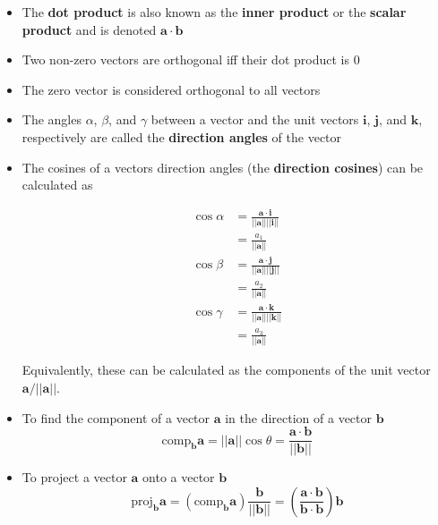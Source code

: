 \documentclass{article}
\begin{document}
\begin{itemize}
  \item The \textbf{dot product} is also known as the \textbf{inner product} or the \textbf{scalar product} and is denoted $\mathbf{a} \cdot \mathbf{b}$

  \item Two non-zero vectors are orthogonal iff their dot product is $0$

  \item The zero vector is considered orthogonal to all vectors

  \item The angles $\alpha$, $\beta$, and $\gamma$ between a vector and the unit vectors $\mathbf{i}$, $\mathbf{j}$, and $\mathbf{k}$, respectively are called the \textbf{direction angles} of the vector

  \item The cosines of a vectors direction angles (the \textbf{direction cosines}) can be calculated as

        \begin{align*}
          \cos \alpha & = \frac{\mathbf{a} \cdot \mathbf{i}}{||\mathbf{a}|| ||\mathbf{i}||} \\
                      & = \frac{a_1}{||\mathbf{a}||}                                        \\
          \cos \beta  & = \frac{\mathbf{a} \cdot \mathbf{j}}{||\mathbf{a}|| ||\mathbf{j}||} \\
                      & = \frac{a_2}{||\mathbf{a}||}                                        \\
          \cos \gamma & = \frac{\mathbf{a} \cdot \mathbf{k}}{||\mathbf{a}|| ||\mathbf{k}||} \\
                      & = \frac{a_3}{||\mathbf{a}||}
        \end{align*}

        Equivalently, these can be calculated as the components of the unit vector $\mathbf{a} / ||\mathbf{a}||$.

  \item To find the component of a vector $\mathbf{a}$ in the direction of a vector $\mathbf{b}$ \[\text{comp}_\mathbf{b} \mathbf{a} = ||\mathbf{a}|| \cos \theta = \frac{\mathbf{a} \cdot \mathbf{b}}{||\mathbf{b}||}\]

  \item To project a vector $\mathbf{a}$ onto a vector $\mathbf{b}$ \[\text{proj}_\mathbf{b} \mathbf{a} = (\text{comp}_\mathbf{b} \mathbf{a}) \frac{\mathbf{b}}{||\mathbf{b}||} = \left( \frac{\mathbf{a} \cdot \mathbf{b}}{\mathbf{b} \cdot \mathbf{b}} \right) \mathbf{b}\]
\end{itemize}
\end{document}
